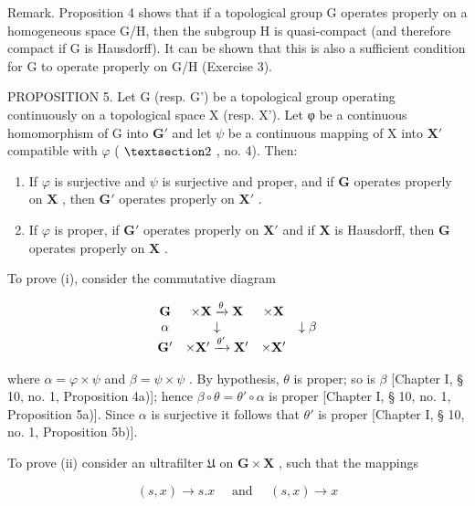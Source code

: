 Remark. Proposition 4 shows that if a topological group G operates properly on a homogeneous space G/H, then the subgroup H is quasi-compact (and therefore compact if G is Hausdorff). It can be shown that this is also a sufficient condition for G to operate properly on G/H (Exercise 3).

PROPOSITION 5. Let G (resp. G') be a topological group operating continuously on a topological space X (resp. X'). Let φ be a continuous homomorphism of G into \(\mathbf{G}'\) and let \(\psi\) be a continuous mapping of X into \(\mathbf{X}'\) compatible with \(\varphi\) ( \(\S 2\) , no. 4). Then:

\begin{enumerate}
\def\labelenumi{(\roman{enumi})}
\item
  If \(\varphi\) is surjective and \(\psi\) is surjective and proper, and if \(\mathbf{G}\) operates properly on \(\mathbf{X}\) , then \(\mathbf{G}'\) operates properly on \(\mathbf{X}'\) .
\item
  If \(\varphi\) is proper, if \(\mathbf{G}'\) operates properly on \(\mathbf{X}'\) and if \(\mathbf{X}\) is Hausdorff, then \(\mathbf{G}\) operates properly on \(\mathbf{X}\) .
\end{enumerate}

To prove (i), consider the commutative diagram

\[
\begin{array}{c c c c} \mathbf {G} & \times \mathbf {X} \xrightarrow {\theta} \mathbf {X} & \times \mathbf {X} \\ \alpha & \downarrow & & \downarrow \beta \\ \mathbf {G} ^ {\prime} & \times \mathbf {X} ^ {\prime} \xrightarrow {\theta^ {\prime}} \mathbf {X} ^ {\prime} & \times \mathbf {X} ^ {\prime} \end{array}
\]

where \(\alpha = \varphi \times \psi\) and \(\beta = \psi \times \psi\) . By hypothesis, \(\theta\) is proper; so is \(\beta\) {[}Chapter I, § 10, no. 1, Proposition 4a){]}; hence \(\beta \circ \theta = \theta' \circ \alpha\) is proper {[}Chapter I, § 10, no. 1, Proposition 5a){]}. Since \(\alpha\) is surjective it follows that \(\theta'\) is proper {[}Chapter I, § 10, no. 1, Proposition 5b){]}.

To prove (ii) consider an ultrafilter \(\mathfrak{U}\) on \(\mathbf{G} \times \mathbf{X}\) , such that the mappings

\[
(s, x) \rightarrow s. x \quad \text { and } \quad (s, x) \rightarrow x
\]

